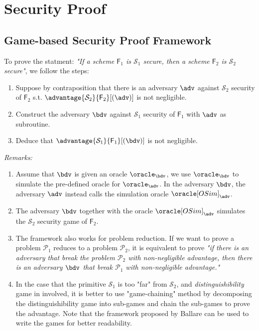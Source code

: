 \newpage
\section{Security Proof}
\subsection{Game-based Security Proof Framework}
To prove the statment: \textit{"If a scheme $\textsf{F}_1$ is $\mathcal{S}_1$ secure, then a scheme $\textsf{F}_2$ is $\mathcal{S}_2$ secure"}, we follow the steps:
\begin{enumerate}
	\item Suppose by contraposition that there is an adversary $\adv$ against $\mathcal{S}_2$ security of $\textsf{F}_2$ s.t. $\advantage{\mathcal{S}_2}{\textsf{F}_2}[(\adv)]$ is not negligible. 
	\item Construct the adversary $\bdv$ against $\mathcal{S}_1$ security of $\textsf{F}_1$ with $\adv$ as subroutine. 
	\item Deduce that $\advantage{\mathcal{S}_1}{\textsf{F}_1}[(\bdv)]$ is not negligible. 
\end{enumerate}

\textit{Remarks:}
\begin{enumerate}
	\item Assume that $\bdv$ is given an oracle $\oracle_{\bdv}$, we use $\oracle_{\bdv}$ to simulate the pre-defined oracle for $\oracle_\adv$. In the adversary $\bdv$, the adversary $\adv$ instead calls the simulation oracle $\oracle[OSim]_\adv$. 
	\item The adversary $\bdv$ together with the oracle $\oracle[OSim]_\adv$ simulates the $\mathcal{S}_2$ security game of $\textsf{F}_2$. 
	\item The framework also works for problem reduction. If we want to prove a problem $\mathcal{P}_1$ reduces to a problem $\mathcal{P}_2$, it is equivalent to prove \textit{"if there is an adversary that break the problem $\mathcal{P}_2$ with non-negligible advantage, then there is an adversary $\bdv$ that break $\mathcal{P}_1$ with non-negligible advantage."}
	\item In the case that the primitive $\mathcal{S}_1$ is too "far" from $\mathcal{S}_2$, and \textit{distinguishibility} game in involved, it is better to use "game-chaining" method by decomposing the distinguishibility game into sub-games and chain the sub-games to prove the advantage. Note that the framework proposed by Ballare can be used to write the games for better readability.  
\end{enumerate}



